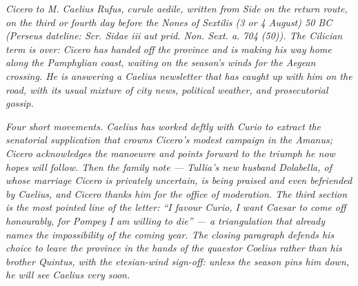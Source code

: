 
\textit{Cicero to M. Caelius Rufus, curule aedile,
written from Side on the return route, on the third or
fourth day before the Nones of Sextilis (3 or 4 August)
50 BC (Perseus dateline: \textit{Scr. Sidae iii aut
prid. Non. Sext. a. 704 (50)}). The Cilician term is
over: Cicero has handed off the province and is making
his way home along the Pamphylian coast, waiting on
the season's winds for the Aegean crossing. He is
answering a Caelius newsletter that has caught up with
him on the road, with its usual mixture of city news,
political weather, and prosecutorial gossip.}

\textit{Four short movements. Caelius has worked
deftly with Curio to extract the senatorial
supplication that crowns Cicero's modest campaign in
the Amanus; Cicero acknowledges the manoeuvre and
points forward to the triumph he now hopes will follow.
Then the family note --- Tullia's new husband Dolabella,
of whose marriage Cicero is privately uncertain, is
being praised and even befriended by Caelius, and
Cicero thanks him for the office of moderation. The
third section is the most pointed line of the letter:
``I favour Curio, I want Caesar to come off honourably,
for Pompey I am willing to die'' --- a triangulation
that already names the impossibility of the coming
year. The closing paragraph defends his choice to leave
the province in the hands of the quaestor Coelius
rather than his brother Quintus, with the
etesian-wind sign-off: unless the season pins him
down, he will see Caelius very soon.}
